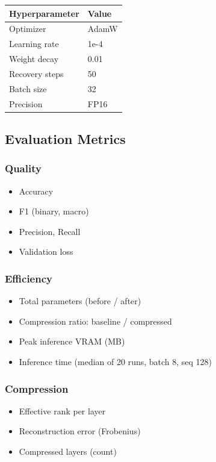 \begin{table}[H]
\centering
\small
\begin{tabular}{ll}
\toprule
\textbf{Hyperparameter} & \textbf{Value} \\
\midrule
Optimizer & AdamW \\
Learning rate & 1e-4 \\
Weight decay & 0.01 \\
Recovery steps & 50 \\
Batch size & 32 \\
Precision & FP16 \\
\bottomrule
\end{tabular}
\end{table}

\subsection{Evaluation Metrics}

\subsubsection{Quality}

\begin{itemize}
\item Accuracy
\item F1 (binary, macro)
\item Precision, Recall
\item Validation loss

\end{itemize}
\subsubsection{Efficiency}

\begin{itemize}
\item Total parameters (before / after)
\item Compression ratio: baseline / compressed
\item Peak inference VRAM (MB)
\item Inference time (median of 20 runs, batch 8, seq 128)

\end{itemize}
\subsubsection{Compression}

\begin{itemize}
\item Effective rank per layer
\item Reconstruction error (Frobenius)
\item Compressed layers (count)

\end{itemize}
